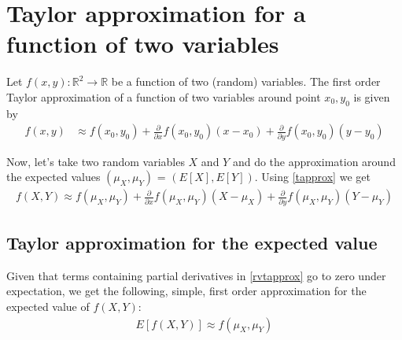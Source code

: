 \documentclass{article}
\begin{document}
\section{Taylor approximation for a function of two variables}

Let $f(x, y): \mathbb{R}^2 \rightarrow \mathbb{R}$ be a function of two (random) variables. The first order Taylor approximation of a function of two variables around point $x_0, y_0$ is given by
\begin{align}
    f(x, y) &\approx f(x_0, y_0) + \frac{\partial }{\partial x} f(x_0, y_0) (x - x_0) + \frac{\partial }{\partial y} f(x_0, y_0) (y - y_0) \label{tapprox}
\end{align}

Now, let's take two random variables $X$ and $Y$ and do the approximation around the expected values $(\mu_X, \mu_Y)$ = $(E[X], E[Y])$. Using \eqref{tapprox} we get
\begin{align}
    f(X, Y) \approx f(\mu_X, \mu_Y) + \frac{\partial }{\partial x} f(\mu_X, \mu_Y) (X - \mu_X) + \frac{\partial }{\partial y} f(\mu_X, \mu_Y) (Y - \mu_Y) \label{rvtapprox}
\end{align}

\subsection{Taylor approximation for the expected value}
Given that terms containing partial derivatives in \eqref{rvtapprox} go to zero under expectation, we get the following, simple, first order approximation for the expected value of $f(X, Y)$:
\begin{align}
    E[f(X, Y)] \approx f(\mu_X, \mu_Y) \label{eapprox}
\end{align}
\end{document}
